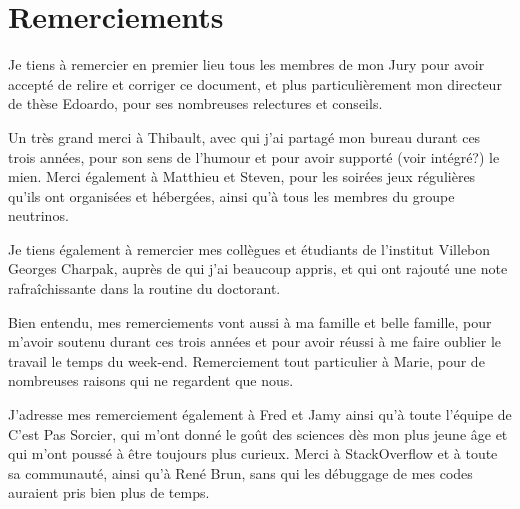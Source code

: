 \chapter*{Remerciements}

Je tiens à remercier en premier lieu tous les membres de mon Jury pour avoir accepté de relire et corriger ce document, et plus particulièrement mon directeur de thèse Edoardo, pour ses nombreuses relectures et conseils. 

Un très grand merci à Thibault, avec qui j'ai partagé mon bureau durant ces trois années, pour son sens de l'humour et pour avoir supporté (voir intégré?) le mien. Merci également à Matthieu et Steven, pour les soirées jeux régulières qu'ils ont organisées et hébergées, ainsi qu'à tous les membres du groupe neutrinos.

Je tiens également à remercier mes collègues et étudiants de l'institut Villebon Georges Charpak, auprès de qui j'ai beaucoup appris, et qui ont rajouté une note rafraîchissante dans la routine du doctorant.

Bien entendu, mes remerciements vont aussi à ma famille et belle famille, pour m'avoir soutenu durant ces trois années et pour avoir réussi à me faire oublier le travail le temps du week-end. Remerciement tout particulier à Marie, pour de nombreuses raisons qui ne regardent que nous.

J'adresse mes remerciement également à Fred et Jamy ainsi qu'à toute l'équipe de C'est Pas Sorcier, qui m'ont donné le goût des sciences dès mon plus jeune âge et qui m'ont poussé à être toujours plus curieux. Merci à StackOverflow et à toute sa communauté, ainsi qu'à René Brun, sans qui les débuggage de mes codes auraient pris bien plus de temps.